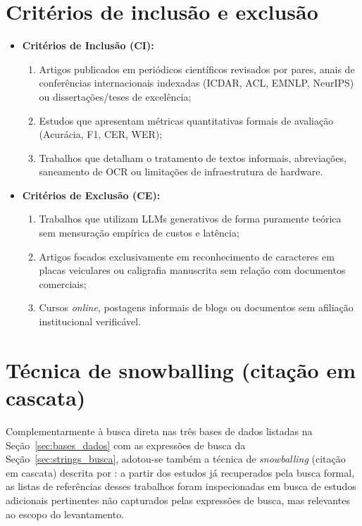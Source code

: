 \begin{apendicesenv}
\section{Critérios de inclusão e exclusão}
\label{sec:criterios_inclusao}
\begin{itemize}
	\item \textbf{Critérios de Inclusão (CI):}
	\begin{enumerate}
		\item Artigos publicados em periódicos científicos revisados por pares, anais de conferências internacionais indexadas (ICDAR, ACL, EMNLP, NeurIPS) ou dissertações/teses de excelência;
		\item Estudos que apresentam métricas quantitativas formais de avaliação (Acurácia, F1, CER, WER);
		\item Trabalhos que detalham o tratamento de textos informais, abreviações, saneamento de OCR ou limitações de infraestrutura de hardware.
	\end{enumerate}
	\item \textbf{Critérios de Exclusão (CE):}
	\begin{enumerate}
		\item Trabalhos que utilizam LLMs generativos de forma puramente teórica sem mensuração empírica de custos e latência;
		\item Artigos focados exclusivamente em reconhecimento de caracteres em placas veiculares ou caligrafia manuscrita sem relação com documentos comerciais;
		\item Cursos \textit{online}, postagens informais de blogs ou documentos sem afiliação institucional verificável.
	\end{enumerate}
\end{itemize}

\section{Técnica de snowballing (citação em cascata)}
\label{sec:snowballing}

Complementarmente à busca direta nas três bases de dados listadas na Seção~\ref{sec:bases_dados} com as expressões de busca da Seção~\ref{sec:strings_busca}, adotou-se também a técnica de \textit{snowballing} (citação em cascata) descrita por : a partir dos estudos já recuperados pela busca formal, as listas de referências desses trabalhos foram inspecionadas em busca de estudos adicionais pertinentes não capturados pelas expressões de busca, mas relevantes ao escopo do levantamento.


\end{apendicesenv}
